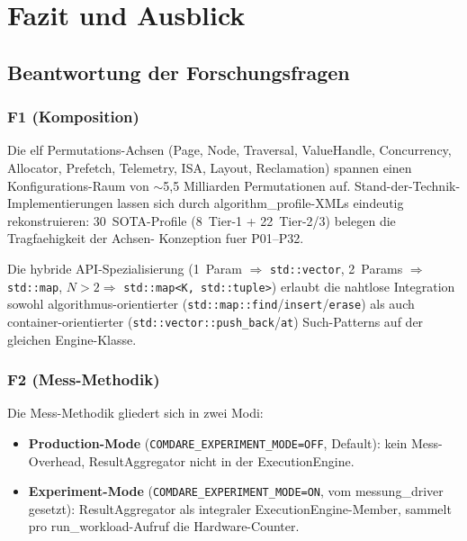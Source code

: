\chapter{Fazit und Ausblick}\label{ch:fazit}


\section{Beantwortung der Forschungsfragen}

\subsection*{F1 (Komposition)}

Die elf Permutations-Achsen (Page, Node, Traversal, ValueHandle,
Concurrency, Allocator, Prefetch, Telemetry, ISA, Layout, Reclamation)
spannen einen Konfigurations-Raum von $\sim$5,5 Milliarden Permutationen
auf. Stand-der-Technik-Implementierungen lassen sich durch
algorithm\_profile-XMLs eindeutig rekonstruieren: 30~SOTA-Profile
(8~Tier-1 + 22~Tier-2/3) belegen die Tragfaehigkeit der Achsen-
Konzeption fuer P01--P32.

Die hybride API-Spezialisierung (1~Param $\Rightarrow$
\texttt{std::vector}, 2~Params $\Rightarrow$ \texttt{std::map},
$N>2 \Rightarrow$ \texttt{std::map<K, std::tuple>}) erlaubt die
nahtlose Integration sowohl algorithmus-orientierter
(\texttt{std::map::find}/\texttt{insert}/\texttt{erase}) als auch
container-orientierter (\texttt{std::vector::push\_back}/\texttt{at})
Such-Patterns auf der gleichen Engine-Klasse.

\subsection*{F2 (Mess-Methodik)}

Die Mess-Methodik gliedert sich in zwei Modi:

\begin{itemize}
    \item \textbf{Production-Mode} (\texttt{COMDARE\_EXPERIMENT\_MODE=OFF},
          Default): kein Mess-Overhead, ResultAggregator nicht in der
          ExecutionEngine.
    \item \textbf{Experiment-Mode} (\texttt{COMDARE\_EXPERIMENT\_MODE=ON},
          vom messung\_driver gesetzt): ResultAggregator als
          integraler ExecutionEngine-Member, sammelt pro
          run\_workload-Aufruf die Hardware-Counter.
\end{itemize}

